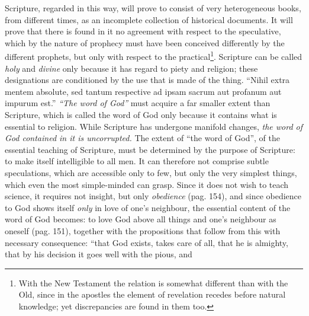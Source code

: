 \documentclass[12pt,a4paper,openany]{book}
\begin{document}
Scripture, regarded in this way, will prove to consist of very heterogeneous books, from different times, as an incomplete collection of historical documents. It will prove that there is found in it no agreement with respect to the speculative, which by the nature of prophecy must have been conceived differently by the different prophets, but only with respect to the practical\footnote{With the New Testament the relation is somewhat different than with the Old, since in the apostles the element of revelation recedes before natural knowledge; yet discrepancies are found in them too.}. Scripture can be called \emph{holy} and \emph{divine} only because it has regard to piety and religion; these designations are conditioned by the use that is made of the thing. ``Nihil extra mentem absolute, sed tantum respective ad ipsam sacrum aut profanum aut impurum est.'' \emph{``The word of God''} must acquire a far smaller extent than Scripture, which is called the word of God only because it contains what is essential to religion. While Scripture has undergone manifold changes, \emph{the word of God contained in it is uncorrupted.} The extent of ``the word of God'', of the essential teaching of Scripture, must be determined by the purpose of Scripture: to make itself intelligible to all men. It can therefore not comprise subtle speculations, which are accessible only to few, but only the very simplest things, which even the most simple-minded can grasp. Since it does not wish to teach science, it requires not insight, but only \emph{obedience} (pag. 154), and since obedience to God shows itself \emph{only} in love of one's neighbour, the essential content of the word of God becomes: to love God above all things and one's neighbour as oneself (pag. 151), together with the propositions that follow from this with necessary consequence: ``that God exists, takes care of all, that he is almighty, that by his decision it goes well with the pious, and
\end{document}
